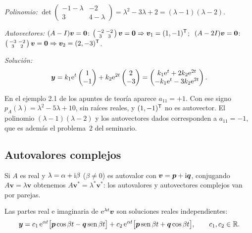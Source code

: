 \documentclass[11pt,twoside]{article}
\newcommand\vy{\bm{y}}
\newcommand\vv{\bm{v}}
\newcommand\vp{\bm{p}}
\newcommand\vq{\bm{q}}
\newcommand\mat[1]{\begin{pmatrix}#1\end{pmatrix}}
\newcommand\smat[1]{\left(\begin{smallmatrix}#1\end{smallmatrix}\right)}
\begin{document}
\begin{ejemplo}[$y_1'=-y_1-2y_2,\ y_2'=3y_1+4y_2$]\label{ej:2-1}
\begin{pasos}
\item \emph{Polinomio:} $\det\smat{-1-\lambda&-2\\3&4-\lambda}=\lambda^2-3\lambda+2=(\lambda-1)(\lambda-2)$.
\item \emph{Autovectores:} $(A-\Id)\vv=\bm0$: $\smat{-2&-2\\3&3}\vv=\bm0\Rightarrow\vv_1=(1,-1)\T$;
$\ (A-2\Id)\vv=\bm0$: $\smat{-3&-2\\3&2}\vv=\bm0\Rightarrow\vv_2=(2,-3)\T$.
\item \emph{Solución:}
\begin{equation*}
\vy=k_1\e^{t}\mat{1\\-1}+k_2\e^{2t}\mat{2\\-3}=\mat{k_1\e^{t}+2k_2\e^{2t}\\ -k_1\e^{t}-3k_2\e^{2t}}.
\end{equation*}
\end{pasos}
\end{ejemplo}

\begin{observacion}
En el ejemplo 2.1 de los apuntes de teoría aparece $a_{11}=+1$. Con ese signo $p_A(\lambda)=\lambda^2-5\lambda+10$,
sin raíces reales, y $(1,-1)^{\mathsf T}$ no es autovector. El polinomio $(\lambda-1)(\lambda-2)$ y los autovectores dados
corresponden a $a_{11}=-1$, que es además el problema~2 del seminario.
\end{observacion}

\subsection{Autovalores complejos}

Si $A$ es real y $\lambda=\alpha+\mathrm{i}\beta$ ($\beta\neq0$) es autovalor con $\vv=\vp+\iu\vq$, conjugando
$A\vv=\lambda\vv$ obtenemos $A\vv^*=\lambda^*\vv^*$: los autovalores y autovectores complejos van por parejas.

\begin{proposicion}\label{prop:complejas}
Las partes real e imaginaria de $\e^{\lambda t}\vv$ son soluciones reales independientes:
\begin{equation}\label{eq:complejas}
\vy=c_1\,\e^{\alpha t}\big[\vp\cos\beta t-\vq\sen\beta t\big]+c_2\,\e^{\alpha t}\big[\vp\sen\beta t+\vq\cos\beta t\big],
\qquad c_1,c_2\in\R .
\end{equation}
\end{proposicion}
\end{document}
